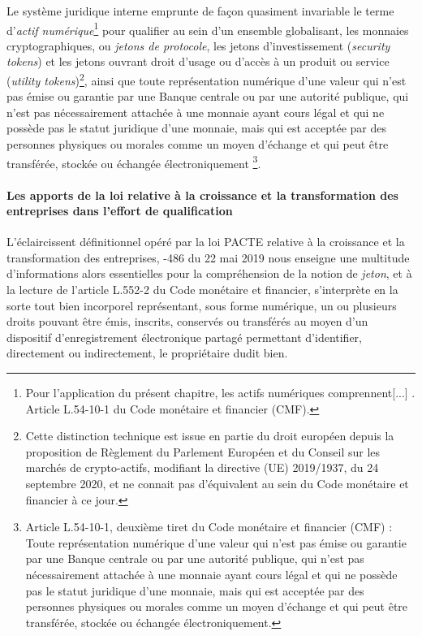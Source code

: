 {Le système juridique interne emprunte de façon quasiment invariable le terme d'\emph{actif numérique}\footnote{\og Pour l'application du présent chapitre, les actifs numériques comprennent[...] \fg. Article L.54-10-1 du Code monétaire et financier (\acrshort{CMF}).} pour qualifier au sein d'un ensemble globalisant, les monnaies cryptographiques, ou \emph{jetons de protocole}, les jetons d'investissement (\emph{security tokens}) et les jetons ouvrant droit d'usage ou d'accès à un produit ou service (\emph{utility tokens})\footnote{Cette distinction technique est issue en partie du droit européen depuis la proposition de Règlement du Parlement Européen et du Conseil sur les marchés de crypto-actifs, modifiant la directive (UE) 2019/1937, du 24 septembre 2020, et ne connait pas d'équivalent au sein du Code monétaire et financier à ce jour.}, ainsi que \og toute représentation numérique d'une valeur qui n'est pas émise ou garantie par une Banque centrale ou par une autorité publique, qui n'est pas nécessairement attachée à une monnaie ayant cours légal et qui ne possède pas le statut juridique d'une monnaie, mais qui est acceptée par des personnes physiques ou morales comme un moyen d'échange et qui peut être transférée, stockée ou échangée électroniquement \fg{}\footnote{Article L.54-10-1, deuxième tiret du Code monétaire et financier (CMF) : \og Toute représentation numérique d'une valeur qui n'est pas émise ou garantie par une Banque centrale ou par une autorité publique, qui n'est pas nécessairement attachée à une monnaie ayant cours légal et qui ne possède pas le statut juridique d'une monnaie, mais qui est acceptée par des personnes physiques ou morales comme un moyen d'échange et qui peut être transférée, stockée ou échangée électroniquement.\fg{}}.

\paragraph{Les apports de la loi relative à la croissance et la transformation des entreprises dans l'effort de qualification}

 L'éclaircissent définitionnel opéré par la loi PACTE relative à la croissance et la transformation des entreprises, -486 du 22 mai 2019 nous enseigne une multitude d'informations alors essentielles pour la compréhension de la notion de \emph{jeton}, et à la lecture de l'article L.552-2 du Code monétaire et financier, s'interprète en la sorte
\og tout bien incorporel représentant, sous forme numérique, un ou plusieurs droits pouvant être émis, inscrits, conservés ou transférés au moyen d'un dispositif d'enregistrement électronique partagé permettant d'identifier, directement ou indirectement, le propriétaire dudit bien\fg.\par

}
